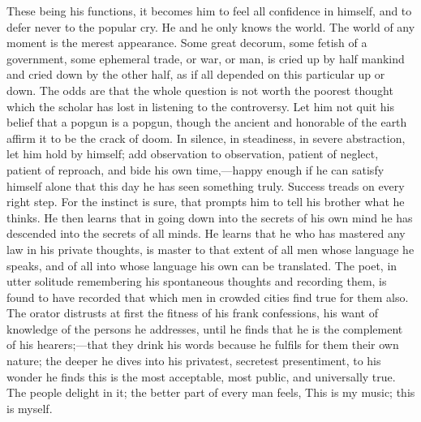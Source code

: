 These being his functions, it becomes him to feel all confidence in
himself, and to defer never to the popular cry. He and he only knows
the world. The world of any moment is the merest appearance. Some
great decorum, some fetish of a government, some ephemeral trade, or
war, or man, is cried up by half mankind and cried down by the other
half, as if all depended on this particular up or down. The odds are
that the whole question is not worth the poorest thought which the
scholar has lost in listening to the controversy. Let him not quit his
belief that a popgun is a popgun, though the ancient and honorable of
the earth affirm it to be the crack of doom. In silence, in
steadiness, in severe abstraction, let him hold by himself; add
 observation to observation, patient of neglect, patient of
reproach, and bide his own time,---hap\-py enough if he can satisfy
himself alone that this day he has seen something truly. Success
treads on every right step. For the instinct is sure, that prompts him
to tell his brother what he thinks. He then learns that in going down
into the secrets of his own mind he has descended into the secrets of
all minds. He learns that he who has mastered any law in his private
thoughts, is master to that extent of all men whose language he
speaks, and of all into whose language his own can be translated. The
poet, in utter solitude remembering his spontaneous thoughts and
recording them, is found to have recorded that which men in crowded
cities find true for them also. The orator distrusts at first the
fitness of his frank confessions, his want of knowledge of the persons
he addresses, until he finds that he is the complement of his
hear\-ers;---that they drink his words because he fulfils for them
their own nature; the deeper he dives into his privatest, secretest
presentiment, to his wonder he finds this is the most acceptable, most
public, and universally true. The people delight in it; the better
part of every man feels, This is my music; this is myself.

